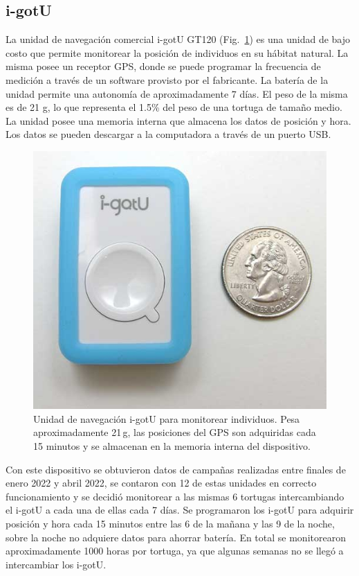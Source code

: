 \subsection{i-gotU}
La unidad de navegación comercial i-gotU GT120 (Fig.~\ref{fig:igotu}) es una unidad de bajo costo que permite monitorear la posición de individuos en su hábitat natural. La misma posee un receptor GPS, donde se puede programar la frecuencia de medición a través de un software provisto por el fabricante. La batería de la unidad permite una autonomía de aproximadamente 7 días. El peso de la misma es de 21 g, lo que representa el 1.5\% del peso de una tortuga de tamaño medio. La unidad  posee una memoria interna que almacena los datos de posición y hora. Los datos se pueden descargar a la computadora a través de un puerto USB.
 
\begin{figure}[ht]
    \begin{center}
       
   
    \includegraphics[width=.8\imsize]{figs/Chap1/igotu.jpg}  
\end{center}
    \caption[Unidad de navegación comercial i-gotU para monitorear individuos.] {Unidad de navegación i-gotU para monitorear individuos. Pesa aproximadamente  21\,g, las posiciones del GPS son adquiridas cada 15 minutos y se almacenan en la memoria interna del dispositivo. }
    \label{fig:igotu}
\end{figure}
Con este dispositivo se obtuvieron datos de campañas realizadas entre finales de enero 2022 y abril 2022, se contaron con 12 de estas unidades en correcto funcionamiento y se decidió monitorear a las mismas 6 tortugas intercambiando el i-gotU a cada una de ellas cada 7 días. Se programaron los i-gotU para adquirir posición y hora cada 15 minutos entre las 6 de la mañana y las 9 de la noche, sobre la noche no adquiere datos para ahorrar batería. En total se monitorearon aproximadamente 1000 horas por tortuga, ya que algunas semanas no se llegó a intercambiar los i-gotU.
 
